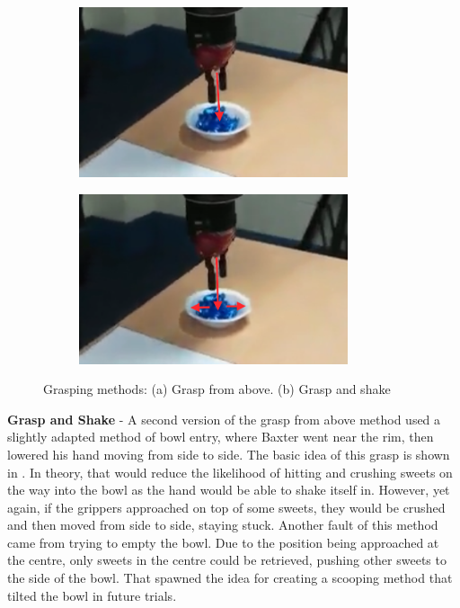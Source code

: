 \begin{figure}[H]
    \centering
    \begin{subfigure}[b]{0.475\textwidth}
        \centering
        \caption{}
        \label{fig:graspfromabove}
        \includegraphics[width=\textwidth, height=5cm]{graspfromabove.png}
    \end{subfigure}
    \hfill
    \begin{subfigure}[b]{0.475\textwidth}  
        \centering 
        \caption{}
        \label{fig:graspandshake}
        \includegraphics[width=\textwidth, height=5cm]{graspandshake.png}
    \end{subfigure}
    \caption{Grasping methods: (a) Grasp from above. (b) Grasp and shake}
    \vspace{0.2cm}
\end{figure}
\textbf{Grasp and Shake} - A second version of the grasp from above method used a slightly adapted method of bowl entry, where Baxter went near the rim, then lowered his hand moving from side to side. The basic idea of this grasp is shown in \textbf{}. In theory, that would reduce the likelihood of hitting and crushing sweets on the way into the bowl as the hand would be able to shake itself in. However, yet again, if the grippers approached on top of some sweets, they would be crushed and then moved from side to side, staying stuck. Another fault of this method came from trying to empty the bowl. Due to the position being approached at the centre, only sweets in the centre could be retrieved, pushing other sweets to the side of the bowl. That spawned the idea for creating a scooping method that tilted the bowl in future trials.
